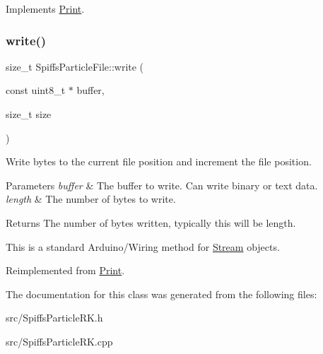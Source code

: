 Implements \mbox{\hyperlink{class_print_a5be30d49adae2406a270c29ba9a3e0a3}{Print}}.

\mbox{\label{class_spiffs_particle_file_ada3fa1782a929e32adab1c161f9d5eeb}} 
\subsubsection{\texorpdfstring{write()}{write()}\hspace{0.1cm}{\footnotesize\ttfamily [2/2]}}
{\footnotesize\ttfamily size\+\_\+t Spiffs\+Particle\+File\+::write (\begin{DoxyParamCaption}\item[{const uint8\+\_\+t $\ast$}]{buffer,  }\item[{size\+\_\+t}]{size }\end{DoxyParamCaption})\hspace{0.3cm}{\ttfamily [virtual]}}



Write bytes to the current file position and increment the file position. 


\begin{DoxyParams}{Parameters}
{\em buffer} & The buffer to write. Can write binary or text data.\\
\hline
{\em length} & The number of bytes to write.\\
\hline
\end{DoxyParams}
\begin{DoxyReturn}{Returns}
The number of bytes written, typically this will be length.
\end{DoxyReturn}
This is a standard Arduino/\+Wiring method for \mbox{\hyperlink{class_stream}{Stream}} objects. 

Reimplemented from \mbox{\hyperlink{class_print_a88864e109589a5be9b0f5ba1327f8421}{Print}}.



The documentation for this class was generated from the following files\+:\begin{DoxyCompactItemize}
\item 
src/Spiffs\+Particle\+R\+K.\+h\item 
src/Spiffs\+Particle\+R\+K.\+cpp\end{DoxyCompactItemize}
